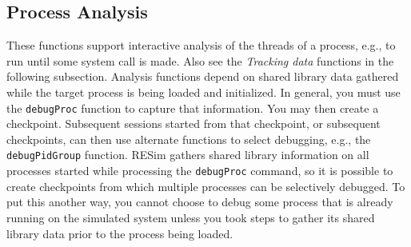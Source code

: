 \documentclass[titlepage]{article}
\begin{document}
\subsection{Process Analysis}
These functions support interactive analysis of the threads of a process, e.g., to run until some system call is made.  Also see the \textit{Tracking data} functions
in the following subsection.  Analysis functions depend on shared library data gathered while the target process is being loaded and initialized.  In general, you
must use the {\tt debugProc} function to capture that information.  You may then create a checkpoint.  Subsequent sessions started from that checkpoint,
or subsequent checkpoints, can then use alternate functions to select debugging, e.g., the {\tt debugPidGroup} function. RESim gathers shared library information on
all processes started while processing the {\tt debugProc} command, so it is possible to create checkpoints from which multiple processes can be selectively
debugged.  To put this another way, you cannot choose to debug some process that is already running on the simulated system unless you took steps to
gather its shared library data prior to the process being loaded.
\end{document}
